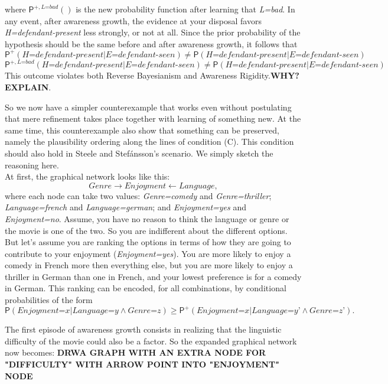 \documentclass[
  11pt,
  dvipsnames,enabledeprecatedfontcommands]{scrartcl}
\newcommand{\pr}[1]{\ensuremath{\mathsf{P}(#1)}}
\newcommand{\ppr}[2]{\ensuremath{\mathsf{P}^{#1}(#2)}}
\begin{document}
where \(\ppr{+, \textit{L=bad}}{}\) is the new probability function
after learning that \textit{L=bad}. In any event, after awareness
growth, the evidence at your disposal favors
\textit{H=defendant-present} less strongly, or not at all. Since the
prior probability of the hypothesis should be the same before and after
awareness growth, it follows that
\[\ppr{+}{\textit{H=defendant-present} \vert \textit{E=defendant-seen}} \neq \pr{\textit{H=defendant-present} \vert \textit{E=defendant-seen}}\]
\[\ppr{+, \textit{L=bad} }{\textit{H=defendant-present} \vert \textit{E=defendant-seen}} \neq \pr{\textit{H=defendant-present} \vert \textit{E=defendant-seen}}\]
This outcome violates both Reverse Bayesianism and Awareness
Rigidity.\textbf{WHY? EXPLAIN}.

So we now have a simpler counterexample that works even without
postulating that mere refinement takes place together with learning of
something new. At the same time, this counterexample also show that
something can be preserved, namely the plausibility ordering along the
lines of condition (C). This condition should also hold in Steele and
Stefánsson's scenario. We simply sketch the reasoning here.\\
At first, the graphical network looks like this:
\[\textit{Genre} \rightarrow \textit{Enjoyment} \leftarrow \textit{Language},\]
where each node can take two values: \textit{Genre=comedy} and
\textit{Genre=thriller}; \textit{Language=french} and
\textit{Language=german}; and \textit{Enjoyment=yes} and
\textit{Enjoyment=no}. Assume, you have no reason to think the language
or genre or the movie is one of the two. So you are indifferent about
the different options. But let's assume you are ranking the options in
terms of how they are going to contribute to your enjoyment
(\textit{Enjoyment=yes}). You are more likely to enjoy a comedy in
French more then everything else, but you are more likely to enjoy a
thriller in German than one in French, and your lowest preference is for
a comedy in German. This ranking can be encoded, for all combinations,
by conditional probabilities of the form
\[\pr{\textit{Enjoyment=x} \vert \textit{Language=y} \wedge \textit{Genre=z}} \geq \ppr{+}{\textit{Enjoyment=x} \vert \textit{Language=y'} \wedge \textit{Genre=z'}}.\]

The first episode of awareness growth consists in realizing that the
linguistic difficulty of the movie could also be a factor. So the
expanded graphical network now becomes:
\textbf{DRWA GRAPH WITH AN EXTRA NODE FOR "DIFFICULTY" WITH ARROW POINT INTO "ENJOYMENT" NODE}
\end{document}
